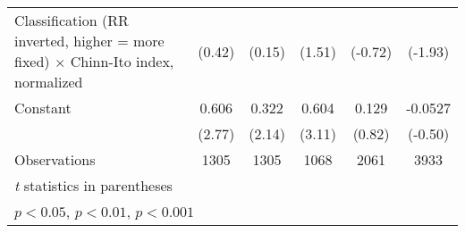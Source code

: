 {\begin{tabular}{l*{5}{c}}
Classification (RR inverted, higher = more fixed) $\times$ Chinn-Ito index, normalized&      (0.42)         &      (0.15)         &      (1.51)         &     (-0.72)         &     (-1.93)         \\
[1em]
Constant            &       0.606\sym{**} &       0.322\sym{*}  &       0.604\sym{**} &       0.129         &     -0.0527         \\
                    &      (2.77)         &      (2.14)         &      (3.11)         &      (0.82)         &     (-0.50)         \\
\hline
Observations        &        1305         &        1305         &        1068         &        2061         &        3933         \\
\hline\hline
\multicolumn{6}{l}{\footnotesize \textit{t} statistics in parentheses}\\
\multicolumn{6}{l}{\footnotesize \sym{*} \(p<0.05\), \sym{**} \(p<0.01\), \sym{***} \(p<0.001\)}\\
\end{tabular}
}
